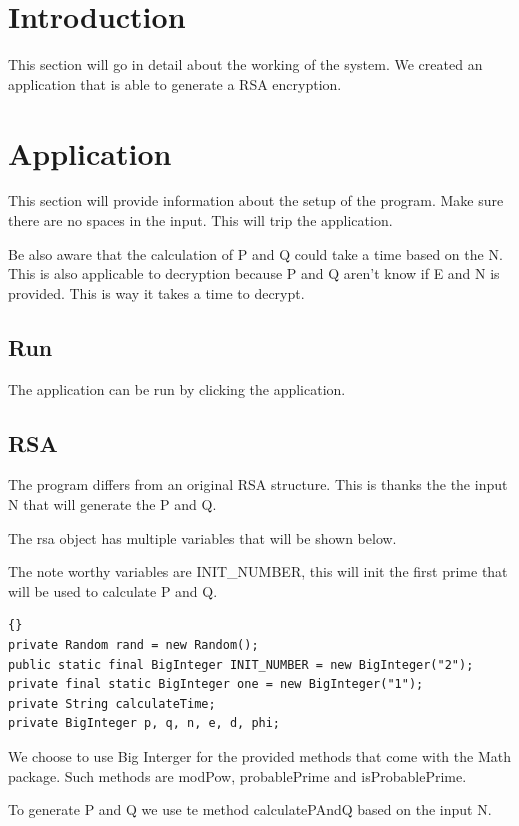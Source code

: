 \section{Introduction} \label{man-introduction}
This section will go in detail about the working of the system.
We created an application that is able to generate a RSA encryption.

\section{Application} \label{man-application}
This section will provide information about the setup of the program.
Make sure there are no spaces in the input. This will trip the application.

Be also aware that the calculation of P and  Q could take a time based on the N.
This is also applicable to decryption because P and Q aren't know if E and N is provided. This is way it takes a time to decrypt. 
\subsection{Run}
The application can be run by clicking the application.

\subsection{RSA}
The program differs from an original RSA structure. This is thanks the the input N that will generate the P and Q.

The rsa object has multiple variables that will be shown below.

The note worthy variables are INIT\_NUMBER, this will init the first prime that will be used to calculate P and Q.

\begin{lstlisting}{}
private Random rand = new Random();
public static final BigInteger INIT_NUMBER = new BigInteger("2");
private final static BigInteger one = new BigInteger("1");
private String calculateTime;
private BigInteger p, q, n, e, d, phi;
\end{lstlisting}

We choose to use Big Interger for the provided methods that come with the Math package.
Such methods are modPow, probablePrime and isProbablePrime.

To generate P and Q we use te method calculatePAndQ based on the input N.

